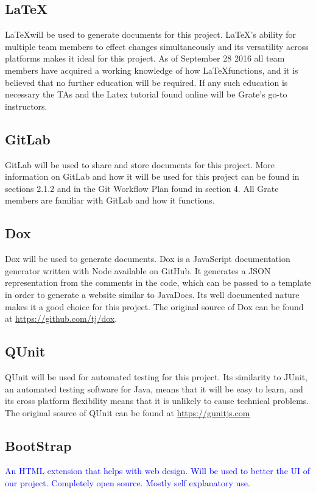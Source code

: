 \documentclass{article}
\begin{document}
\subsection{\LaTeX}

\LaTeX will be used to generate documents for this project. \LaTeX's ability for 
multiple team members to effect changes simultaneously and its versatility 
across platforms makes it ideal for this project. As of September 28 2016 all 
team members have acquired a working knowledge of how \LaTeX functions, and it 
is 
believed that no further education will be required. If any such education is 
necessary the TAs and the Latex tutorial found online will be Grate's go-to 
instructors. 

\subsection{GitLab}

GitLab will be used to share and store documents for this project. More 
information on GitLab and how it will be used for this project can be found in 
sections 2.1.2 and in the Git Workflow Plan found in section 4. All Grate 
members are familiar with GitLab and how it functions. 

\subsection{Dox}
Dox will be used to generate documents. Dox is a JavaScript documentation 
generator written with Node available on GitHub. It generates a JSON 
representation from the comments in the code, which can be passed to a template 
in order to generate a website similar to JavaDocs. Its well documented nature 
makes it a good choice for this project. The original source of Dox can be found 
at
\href{https://github.com/tj/dox}{https://github.com/tj/dox}.

\subsection{QUnit}
QUnit will be used for automated testing for this project. Its similarity to 
JUnit, an automated testing software for Java, means that it will be easy to 
learn, and its cross platform flexibility means that it is unlikely to cause 
technical problems. The original source of QUnit can be found at
\href{https://qunitjs.com/}{https://gunitjs.com}

\subsection{BootStrap}
\textcolor{blue}{
An HTML extension that helps with web design. Will be used to better the UI of our project. Completely open source. Mostly self explanatory use.}
\end{document}
